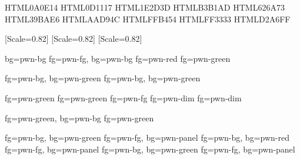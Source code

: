
\usepackage{xcolor}
\usepackage{fontspec}
\usepackage{listings}
\usepackage{mdframed}

\definecolor{pwn-bg}      {HTML}{0A0E14}   %
\definecolor{pwn-panel}   {HTML}{0D1117}   %
\definecolor{pwn-border}  {HTML}{1E2D3D}   %
\definecolor{pwn-fg}      {HTML}{B3B1AD}   %
\definecolor{pwn-dim}     {HTML}{626A73}   %
\definecolor{pwn-blue}    {HTML}{39BAE6}   %
\definecolor{pwn-green}   {HTML}{AAD94C}   %
\definecolor{pwn-orange}  {HTML}{FFB454}   %
\definecolor{pwn-red}     {HTML}{FF3333}   %
\definecolor{pwn-purple}  {HTML}{D2A6FF}   %

\setmainfont{DejaVu Sans Mono}[Scale=0.82]
\setmonofont{DejaVu Sans Mono}[Scale=0.82]
\setsansfont{DejaVu Sans Mono}[Scale=0.82]

    {bg=pwn-bg}
          {fg=pwn-fg,  bg=pwn-bg}
         {fg=pwn-red}
         {fg=pwn-green}

      {fg=pwn-bg,   bg=pwn-green}
    {fg=pwn-bg,   bg=pwn-green}

                {fg=pwn-green}
             {fg=pwn-green}
               {fg=pwn-fg}
                 {fg=pwn-dim}
            {fg=pwn-dim}

           {fg=pwn-green, bg=pwn-bg}
        {fg=pwn-green}

          {fg=pwn-bg,   bg=pwn-green}
           {fg=pwn-fg,   bg=pwn-panel}
  {fg=pwn-bg,   bg=pwn-red}
   {fg=pwn-fg,   bg=pwn-panel}
  {fg=pwn-bg,   bg=pwn-green}
   {fg=pwn-fg,   bg=pwn-panel}

